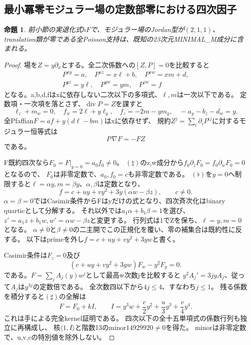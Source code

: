 \documentclass[a4paper,11pt]{ltjsarticle}
\newtheorem{proposition}{命題}[section]
\theoremstyle{definition}
\begin{document}
\subsection{最小冪零モジュラー場の定数部零における四次因子}
\begin{proposition}\label{prop:quartic-minimal-nilpotent-support}
前小節の実退化式$hF$で、モジュラー場のJordan型が$(2,1,1)$、
translation類が零である全Poisson支持は、既知の23次元MINIMAL\_M成分に含まれる。
\end{proposition}
\begin{proof}
場を$Z=y\partial_x$とする。全二次係数への$[Z,P]=0$を比較すると
\[
\begin{gathered}
 P^{xy}=a,\quad P^{xz}=x\ell+b,\quad P^{xw}=xm+d,\\
 P^{yz}=y\ell,\quad P^{yw}=ym,\quad P^{zw}=f
\end{gathered}
\]
となる。a,b,d,fはxに依存しない二次以下の多項式、$\ell,m$は一次以下である。
定数項・一次項を落とさず、$\operatorname{div}P=Z$を課すと
\[
 \ell_z+m_w=0,\quad f_w=2\ell+y\ell_y,\quad
 f_z=-2m-ym_y,\quad -a_y-b_z-d_w=y.                       \tag{\flat}
\]
全Pfaffian$F=af+y(d\ell-bm)$はxに依存せず、
規約$Z^j=\sum_i\partial_iP^{ij}$に対するモジュラー恒等式は
\[
 P\,\nabla F=-FZ                                                    \tag{\natural}
\]
である。

F既約四次なら$F_0=F|_{y=0}=a_0f_0\ne0$。
$(\natural)$のz,w成分から$f_0\partial_zF_0=f_0\partial_wF_0=0$となるので、
$F_0$は非零定数で、$a_0,f_0=c$も非零定数である。
$(\flat)$を$y=0$へ制限すると$\ell=\alpha y,m=\beta y$、$\alpha,\beta$は定数となり、
\[
 f=c+uy+vy^2+3y(\alpha w-\beta z),\qquad c\ne0.
\]
$\alpha=\beta=0$ではCasimir条件からFはyだけの式となり、四次斉次化はbinary quarticとして分解する。
それ以外では$a_1\alpha+b_1\beta=1$を選び、
$z'=a_1z+b_1w,w'=\alpha w-\beta z$と変更する。
行列式は1でZを保ち、$\ell=y,m=0$となる。
$\alpha\ne0$と$\beta\ne0$の二主開でこの正規化を覆い、零の補集合は既約性に反する。
以下はprimeを外し$f=c+uy+vy^2+3yw$と書く。

Casimir条件は$F_z=0$及び
\[
 (c+uy+vy^2+3yw)F_w-y^2F_y=0.                             \tag{\sharp}
\]
である。$F=\sum_j A_j(y)w^j$として最高w次数jを比較すると
$y^2A_j'=3jyA_j$、従って$A_j$は$y^{3j}$の定数倍である。
全次数四以下から$4j\le4$、すなわち$j\le1$。
残る係数を積分すると$(\sharp)$の全解は
\[
 F=F_0+kI,\qquad I=y^3w+\frac c2y^2+\frac u3y^3+\frac v4y^4.
\]
これは手による完全kernel証明である。
四次以下の全十五単項式の係数行列も独立に再構成し、
核$\langle1,I\rangle$と階数13のminor$14929920\ne0$を得た。
minorは非零定数で、u,v,cの特別値を除外しない。


\end{proof}
\end{document}
